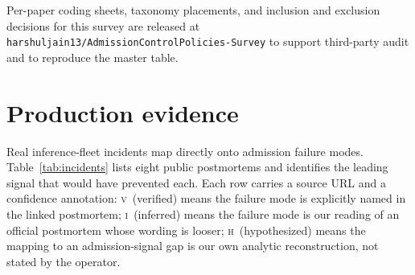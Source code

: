 \documentclass[11pt,letterpaper]{article}
\theoremstyle{definition}
\begin{document}
Per-paper coding sheets, taxonomy placements, and inclusion and
exclusion decisions for this survey are released at
\texttt{harshuljain13/}\allowbreak\texttt{AdmissionControlPolicies-Survey}
to support third-party audit and to reproduce the master table.

\section{Production evidence}
\label{sec:prod}

Real inference-fleet incidents map directly onto admission failure
modes. Table~\ref{tab:incidents} lists eight public postmortems and
identifies the leading signal that would have prevented each. Each
row carries a source URL and a confidence annotation:
\textsc{v}~(verified) means the failure mode is explicitly named in
the linked postmortem; \textsc{i}~(inferred) means the failure mode
is our reading of an official postmortem whose wording is looser;
\textsc{h}~(hypothesized) means the mapping to an admission-signal
gap is our own analytic reconstruction, not stated by the operator.
\end{document}
